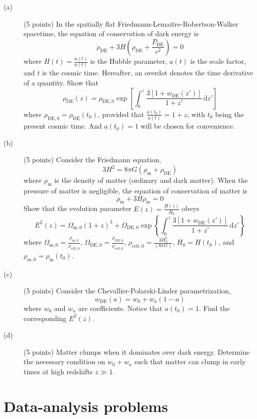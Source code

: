 \begin{description}
\item[(a)] (5 points) In the spatially flat Friedmann-Lemaitre-Robertson-Walker
  spacetime, the equation of conservation of dark energy is
  \[ \dot{\rho}_{\mathrm{DE}} + 3H\left(\rho_{\mathrm{DE}}
     + \frac{P_{\mathrm{DE}}}{c^2}\right) = 0 \]
  where $H(t) = \frac{\dot{a}(t)}{a(t)}$ is the Hubble parameter, $a(t)$ is
  the scale factor, and $t$ is the cosmic time. Hereafter, an overdot denotes
  the time derivative of a quantity. Show that
  \[ \rho_{\mathrm{DE}}(z) = \rho_{\mathrm{DE},0}
     \exp\left[\int_0^z \frac{3\left[1 + w_{\mathrm{DE}}(z')\right]}{1+z'}
     \,\mathrm{d}z'\right] \]
  where $\rho_{\mathrm{DE},0} = \rho_{\mathrm{DE}}(t_0)$, provided that
  $\frac{a(t_0)}{a(t)} = 1 + z$, with $t_0$ being the present cosmic time. And
  $a(t_0) = 1$ will be chosen for convenience.
\item[(b)] (5 points) Consider the Friedmann equation,
  \[ 3H^2 = 8\pi G\left(\rho_{\mathrm{m}} + \rho_{\mathrm{DE}}\right) \]
  where $\rho_{\mathrm{m}}$ is the density of matter (ordinary and dark
  matter). When the pressure of matter is negligible, the equation of
  conservation of matter is
  \[ \dot{\rho}_{\mathrm{m}} + 3H\rho_{\mathrm{m}} = 0 \]
  Show that the evolution parameter $E(z) = \frac{H(z)}{H_0}$ obeys
  \[ E^2(z) = \Omega_{\mathrm{m},0}(1+z)^3 + \Omega_{\mathrm{DE},0}
     \exp\left\{\int_0^z \frac{3\left[1 + w_{\mathrm{DE}}(z')\right]}{1+z'}
     \,\mathrm{d}z'\right\} \]
  where $\Omega_{\mathrm{m},0} = \frac{\rho_{\mathrm{m},0}}{\rho_{\mathrm{crit},0}}$,
  $\Omega_{\mathrm{DE},0} = \frac{\rho_{\mathrm{DE},0}}{\rho_{\mathrm{crit},0}}$,
  $\rho_{\mathrm{crit},0} = \frac{3H_0^2}{(8\pi G)}$, $H_0 = H(t_0)$, and
  $\rho_{\mathrm{m},0} = \rho_{\mathrm{m}}(t_0)$.
\item[(c)] (5 points) Consider the Chevallier-Polarski-Linder parametrization,
  \[ w_{\mathrm{DE}}(a) = w_0 + w_a(1 - a) \]
  where $w_0$ and $w_a$ are coefficients. Notice that $a(t_0) = 1$. Find the
  corresponding $E^2(z)$.
\item[(d)] (5 points) Matter clumps when it dominates over dark energy.
  Determine the necessary condition on $w_0 + w_a$ such that matter can clump
  in early times at high redshifts $z \gg 1$.
\end{description}

\section*{Data-analysis problems}

